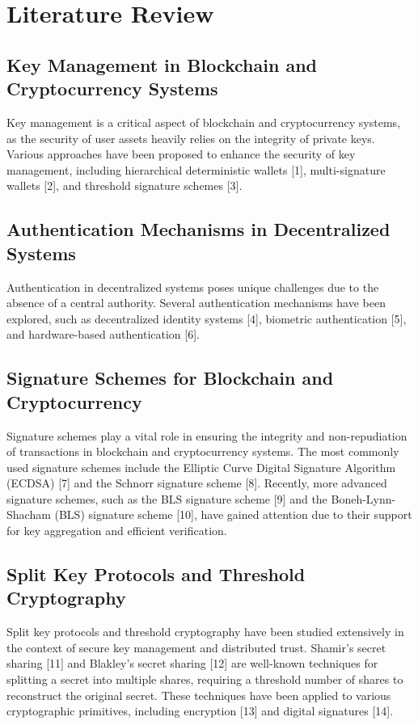 \chapter{Literature Review}

\section{Key Management in Blockchain and Cryptocurrency Systems}
Key management is a critical aspect of blockchain and cryptocurrency systems, as the security of user assets heavily relies on the integrity of private keys. Various approaches have been proposed to enhance the security of key management, including hierarchical deterministic wallets [1], multi-signature wallets [2], and threshold signature schemes [3].

\section{Authentication Mechanisms in Decentralized Systems}
Authentication in decentralized systems poses unique challenges due to the absence of a central authority. Several authentication mechanisms have been explored, such as decentralized identity systems [4], biometric authentication [5], and hardware-based authentication [6].

\section{Signature Schemes for Blockchain and Cryptocurrency}
Signature schemes play a vital role in ensuring the integrity and non-repudiation of transactions in blockchain and cryptocurrency systems. The most commonly used signature schemes include the Elliptic Curve Digital Signature Algorithm (ECDSA) [7] and the Schnorr signature scheme [8]. Recently, more advanced signature schemes, such as the BLS signature scheme [9] and the Boneh-Lynn-Shacham (BLS) signature scheme [10], have gained attention due to their support for key aggregation and efficient verification.

\section{Split Key Protocols and Threshold Cryptography}
Split key protocols and threshold cryptography have been studied extensively in the context of secure key management and distributed trust. Shamir's secret sharing [11] and Blakley's secret sharing [12] are well-known techniques for splitting a secret into multiple shares, requiring a threshold number of shares to reconstruct the original secret. These techniques have been applied to various cryptographic primitives, including encryption [13] and digital signatures [14].

